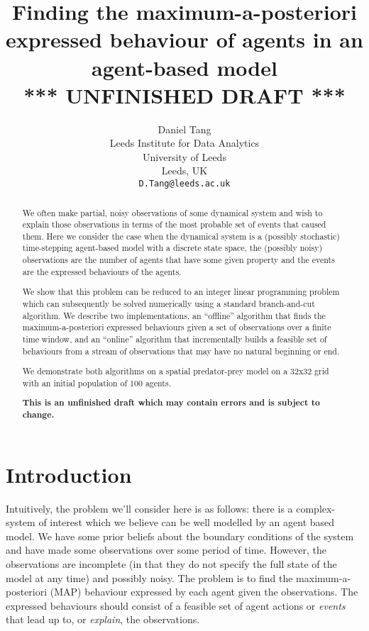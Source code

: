 \documentclass{article}
\title{Finding the maximum-a-posteriori expressed behaviour of agents in an agent-based model\\
*** UNFINISHED DRAFT ***}
\author{
  Daniel Tang\\
  Leeds Institute for Data Analytics\\
  University of Leeds\\
  Leeds, UK\\
  \texttt{D.Tang@leeds.ac.uk} \\
}
\begin{document}
\maketitle

\begin{abstract}
We often make partial, noisy observations of some dynamical system and wish to explain those observations in terms of the most probable set of events that caused them. Here we consider the case when the dynamical system is a (possibly stochastic) time-stepping agent-based model with a discrete state space, the  (possibly noisy) observations are the number of agents that have some given property and the events are the expressed behaviours of the agents.

We show that this problem can be reduced to an integer linear programming problem which can subsequently be solved numerically using a standard branch-and-cut algorithm. We describe two implementations, an ``offline'' algorithm that finds the maximum-a-posteriori expressed behaviours given a set of observations over a finite time window, and an ``online'' algorithm that incrementally builds a feasible set of behaviours from a stream of observations that may have no natural beginning or end.

We demonstrate both algorithms on a spatial predator-prey model on a 32x32 grid with an initial population of 100 agents.

\textbf{This is an unfinished draft which may contain errors and is subject to change.}
\end{abstract}


\section{Introduction}

Intuitively, the problem we'll consider here is as follows: there is a complex-system of interest which we believe can be well modelled by an agent based model. We have some prior beliefs about the boundary conditions of the system and have made some observations over some period of time. However, the observations are incomplete (in that they do not specify the full state of the model at any time) and possibly noisy. The problem is to find the maximum-a-posteriori (MAP) behaviour expressed by each agent given the observations. The expressed behaviours should consist of a feasible set of agent actions or \textit{events} that lead up to, or \textit{explain}, the observations.
\end{document}
